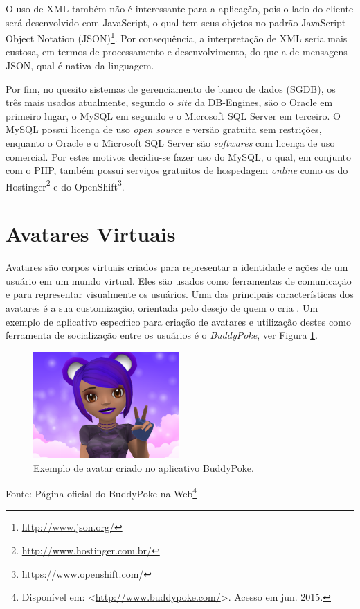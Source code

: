 \par 
O uso de XML também não é interessante para a aplicação, pois o lado do cliente será desenvolvido com JavaScript, o qual tem seus objetos no padrão JavaScript Object Notation (JSON)\footnote{\url{http://www.json.org/}}. Por consequência, a interpretação de XML seria mais custosa, em termos de processamento e desenvolvimento, do que a de mensagens JSON, qual é nativa da linguagem. 
\par
Por fim, no quesito sistemas de gerenciamento de banco de dados (SGDB), os três mais usados atualmente, segundo o \textit{site} da DB-Engines\citeyearpar{dbEngines2015}, são o Oracle em primeiro lugar, o MySQL em segundo e o Microsoft SQL Server em terceiro. O MySQL possui licença de uso \textit{open source} e versão gratuita sem restrições, enquanto o Oracle e o Microsoft SQL Server são \textit{softwares} com licença de uso comercial. Por estes motivos decidiu-se fazer uso do MySQL, o qual, em conjunto com o PHP, também possui serviços gratuitos de hospedagem \textit{online} como os do Hostinger\footnote{\url{http://www.hostinger.com.br/}} e do OpenShift\footnote{\url{https://www.openshift.com/}}. 

\section{Avatares Virtuais}
Avatares são corpos virtuais criados para representar a identidade e ações de um usuário em um mundo virtual. Eles são usados como ferramentas de comunicação e para representar visualmente os usuários. Uma das principais características dos avatares é a sua customização, orientada pelo desejo de quem o cria \cite{ducheneaut2009}. Um exemplo de aplicativo específico para criação de avatares e utilização destes como ferramenta de socialização entre os usuários é o \textit{BuddyPoke}, ver Figura \ref{fig:avatar}. \par

\begin{figure}[h]
    \caption{Exemplo de avatar criado no aplicativo BuddyPoke.}
    \centerline{\includegraphics[width=15em]{figuras/avatar.png}}
    \label{fig:avatar}
\end{figure}
\centerline{Fonte: Página oficial do BuddyPoke na Web\footnote{Disponível em: <\url{http://www.buddypoke.com/}>. Acesso em jun. 2015.}}

